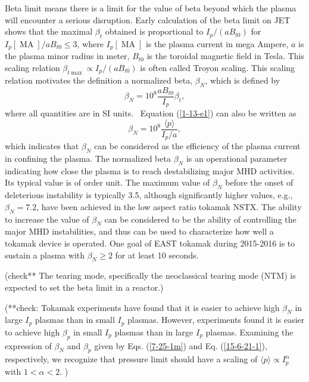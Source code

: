 \documentclass{article}
\newcommand{\tmop}[1]{\ensuremath{\operatorname{#1}}}
\begin{document}
Beta limit means there is a limit for the value of beta beyond which the
plasma will encounter a serious disruption. Early calculation of the beta
limit on JET shows that the maximal $\beta_t$ obtained is proportional to $I_p
/ (a B_{t 0})$ for $I_p [\tmop{MA}] / a B_{t 0} \leqslant 3$, where $I_p
[\tmop{MA}]$ is the plasma current in mega Ampere, $a$ is the plasma minor
radius in meter, $B_{t 0}$ is the toroidal magnetic field in Tesla. This
scaling relation $\beta_{t \max} \propto I_p / (a B_{t 0})$ is often called
Troyon scaling. This scaling relation motivates the definition a normalized
beta, $\beta_N$, which is defined by
\begin{equation}
  \label{1-13-e1} \beta_N = 10^8 \frac{a B_{t 0}}{I_p} \beta_t,
\end{equation}
where all quantities are in SI units. \ Equation (\ref{1-13-e1}) can also be
written as
\begin{equation}
  \label{15-6-21-1} \beta_N = 10^8 \frac{\langle p \rangle}{I_p / a},
\end{equation}
which indicates that $\beta_N$ can be considered as the efficiency of the
plasma current in confining the plasma. The normalized beta $\beta_N$ is an
operational parameter indicating how close the plasma is to reach
destabilizing major MHD activities. Its typical value is of order unit. The
maximum value of $\beta_N$ before the onset of deleterious instability is
typically 3.5, although significantly higher values, e.g., $\beta_N = 7.2$,
have been achieved in the low aspect ratio tokamak NSTX{\cite{sabbagh2006}}.
The ability to increase the value of $\beta_N$ can be considered to be the
ability of controlling the major MHD instabilities, and thus can be used to
characterize how well a tokamak device is operated. One goal of EAST tokamak
during 2015-2016 is to sustain a plasma with $\beta_N \geqslant 2$ for at
least 10 seconds.

(check** The tearing mode, specifically the neoclassical tearing mode (NTM)
is expected to set the beta limit in a reactor.)

(**check: Tokamak experiments have found that it is easier to achieve high
$\beta_N$ in large $I_p$ plasmas than in small $I_p$ plasmas. However,
experiments found it is easier to achieve high $\beta_p$ in small $I_p$
plasmas than in large $I_p$ plasmas. Examining the expression of $\beta_N$ and
$\beta_p$ given by Eqs. (\ref{7-25-1m}) and Eq. (\ref{15-6-21-1}),
respectively, we recognize that pressure limit should have a scaling of
$\langle p \rangle \propto I_p^{\alpha}$ with $1 < \alpha < 2$. )
\end{document}
